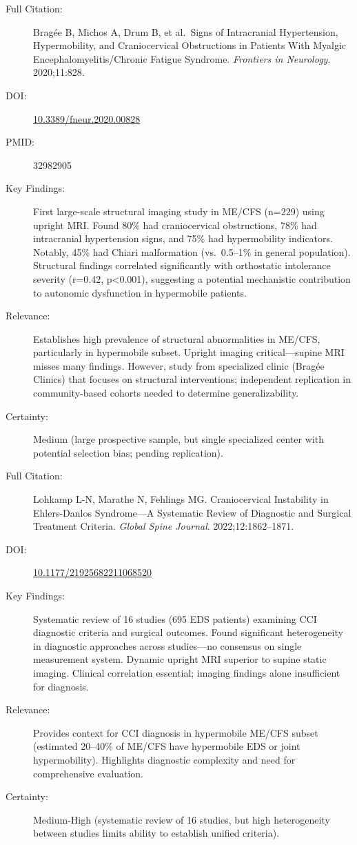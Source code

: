 \begin{description}
    \item[Full Citation:] Bragée B, Michos A, Drum B, et al.\ Signs of Intracranial Hypertension, Hypermobility, and Craniocervical Obstructions in Patients With Myalgic Encephalomyelitis/Chronic Fatigue Syndrome. \textit{Frontiers in Neurology}. 2020;11:828.
    \item[DOI:] \href{https://doi.org/10.3389/fneur.2020.00828}{10.3389/fneur.2020.00828}
    \item[PMID:] 32982905
    \item[Key Findings:] First large-scale structural imaging study in ME/CFS (n=229) using upright MRI. Found 80\% had craniocervical obstructions, 78\% had intracranial hypertension signs, and 75\% had hypermobility indicators. Notably, 45\% had Chiari malformation (vs.\ 0.5--1\% in general population). Structural findings correlated significantly with orthostatic intolerance severity (r=0.42, p<0.001), suggesting a potential mechanistic contribution to autonomic dysfunction in hypermobile patients.
    \item[Relevance:] Establishes high prevalence of structural abnormalities in ME/CFS, particularly in hypermobile subset. Upright imaging critical---supine MRI misses many findings. However, study from specialized clinic (Bragée Clinics) that focuses on structural interventions; independent replication in community-based cohorts needed to determine generalizability.
    \item[Certainty:] Medium (large prospective sample, but single specialized center with potential selection bias; pending replication).
\end{description}

\begin{description}
    \item[Full Citation:] Lohkamp L-N, Marathe N, Fehlings MG. Craniocervical Instability in Ehlers-Danlos Syndrome---A Systematic Review of Diagnostic and Surgical Treatment Criteria. \textit{Global Spine Journal}. 2022;12:1862--1871.
    \item[DOI:] \href{https://doi.org/10.1177/21925682211068520}{10.1177/21925682211068520}
    \item[Key Findings:] Systematic review of 16 studies (695 EDS patients) examining CCI diagnostic criteria and surgical outcomes. Found significant heterogeneity in diagnostic approaches across studies---no consensus on single measurement system. Dynamic upright MRI superior to supine static imaging. Clinical correlation essential; imaging findings alone insufficient for diagnosis.
    \item[Relevance:] Provides context for CCI diagnosis in hypermobile ME/CFS subset (estimated 20--40\% of ME/CFS have hypermobile EDS or joint hypermobility). Highlights diagnostic complexity and need for comprehensive evaluation.
    \item[Certainty:] Medium-High (systematic review of 16 studies, but high heterogeneity between studies limits ability to establish unified criteria).
\end{description}

